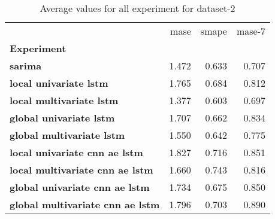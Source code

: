 \begin{table}[h]
\centering
\caption{Average values for all experiment for dataset-2}
\label{table:Average-metric-dataset-2}
\begin{tabular}{lrrr}
\toprule
{} &   mase &  smape &  mase-7 \\
\textbf{Experiment                     } &        &        &         \\
\midrule
\textbf{sarima                         } &  1.472 &  0.633 &   0.707 \\
\textbf{local univariate lstm          } &  1.765 &  0.684 &   0.812 \\
\textbf{local multivariate lstm        } &  1.377 &  0.603 &   0.697 \\
\textbf{global univariate lstm         } &  1.707 &  0.662 &   0.834 \\
\textbf{global multivariate lstm       } &  1.550 &  0.642 &   0.775 \\
\textbf{local univariate cnn ae lstm   } &  1.827 &  0.716 &   0.851 \\
\textbf{local multivariate cnn ae lstm } &  1.660 &  0.743 &   0.816 \\
\textbf{global univariate cnn ae lstm  } &  1.734 &  0.675 &   0.850 \\
\textbf{global multivariate cnn ae lstm} &  1.796 &  0.703 &   0.890 \\
\bottomrule
\end{tabular}
\end{table}

